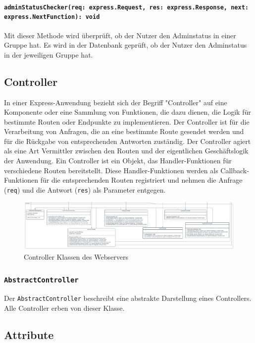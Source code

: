 \documentclass{entwurfsheft}
\begin{document}
\paragraph{\texttt{adminStatusChecker(req: express.Request, res: express.Response, next: express.NextFunction): void}}
Mit dieser Methode wird überprüft, ob der Nutzer den Adminstatus in einer Gruppe hat. Es wird in der Datenbank geprüft, ob der Nutzer den Adminstatus in der jeweiligen Gruppe hat.

\newpage

\subsection{Controller}
In einer Express-Anwendung bezieht sich der Begriff "Controller" auf eine Komponente oder eine Sammlung von Funktionen, die dazu dienen, die Logik für bestimmte Routen oder Endpunkte zu implementieren.
Der Controller ist für die Verarbeitung von Anfragen, die an eine bestimmte Route gesendet werden und für die Rückgabe von entsprechenden Antworten zuständig.
Der Controller agiert als eine Art Vermittler zwischen den Routen und der eigentlichen Geschäftslogik der Anwendung.
Ein Controller ist ein Objekt, das Handler-Funktionen für verschiedene Routen bereitstellt.
Diese Handler-Funktionen werden als Callback-Funktionen für die entsprechenden Routen registriert und nehmen die Anfrage (\texttt{req}) und die Antwort (\texttt{res}) als Parameter entgegen.


\begin{figure}[htp]
    \centering
    \includegraphics[width = 1\textwidth]{images/webserver/controller.pdf}
    \caption{Controller Klassen des Webservers}
    \label{fig:controller}
\end{figure}

\subsubsection{\texttt{AbstractController}}\label{sec:AbstractController}
Der \texttt{AbstractController} beschreibt eine abstrakte Darstellung eines Controllers. Alle Controller erben von dieser Klasse.
\subsection*{Attribute}
\end{document}
